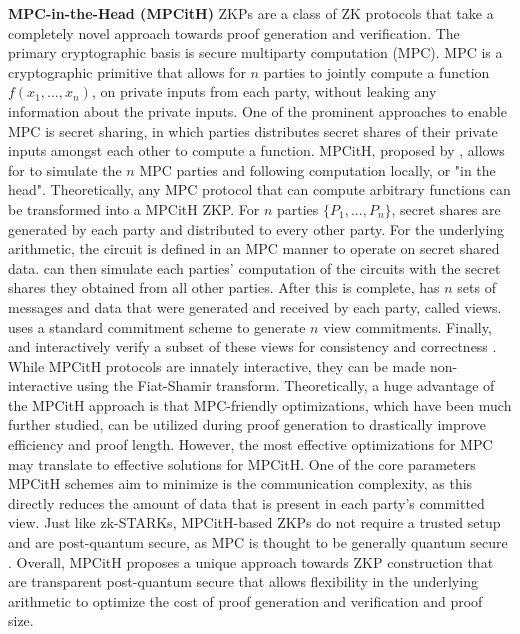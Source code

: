 \textbf{MPC-in-the-Head (MPCitH)} ZKPs are a class of ZK protocols that take a completely novel approach towards proof generation and verification. The primary cryptographic basis is secure multiparty computation (MPC). MPC is a cryptographic primitive that allows for $n$ parties to jointly compute a function $f(x_1, ..., x_n)$, on private inputs from each party, without leaking any information about the private inputs. One of the prominent approaches to enable MPC is secret sharing, in which parties distributes secret shares of their private inputs amongst each other to compute a function. MPCitH, proposed by \cite{ishai2007zero}, allows for \Prv to simulate the $n$ MPC parties and following computation locally, or "in the head". Theoretically, any MPC protocol that can compute arbitrary functions can be transformed into a MPCitH ZKP. For $n$ parties $\{P_1,...,P_n\}$, secret shares are generated by each party and distributed to every other party. For the underlying arithmetic, the circuit \Cir is defined in an MPC manner to operate on secret shared data. \Prv can then simulate each parties' computation of the circuits with the secret shares they obtained from all other parties. After this is complete, \Prv has $n$ sets of messages and data that were generated and received by each party, called views. \Prv uses a standard commitment scheme to generate $n$ view commitments. Finally, \Prv and \Vrf interactively verify a subset of these views for consistency and correctness \cite{sidorenco2021formal}. While MPCitH protocols are innately interactive, they can be made non-interactive using the Fiat-Shamir transform. Theoretically, a huge advantage of the MPCitH approach is that MPC-friendly optimizations, which have been much further studied, can be utilized during proof generation to drastically improve \Prv efficiency and proof length. However, the most effective optimizations for MPC may translate to effective solutions for MPCitH. One of the core parameters MPCitH schemes aim to minimize is the communication complexity, as this directly reduces the amount of data that is present in each party's committed view. Just like zk-STARKs, MPCitH-based ZKPs do not require a trusted setup and are post-quantum secure, as MPC is thought to be generally quantum secure \cite{sidorenco2021formal}. Overall, MPCitH proposes a unique approach towards ZKP construction that are transparent post-quantum secure that allows flexibility in the underlying arithmetic to optimize the cost of proof generation and verification and proof size.


